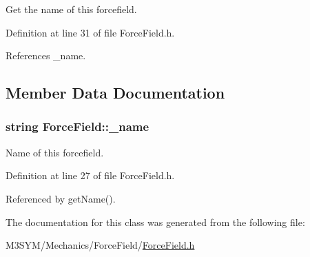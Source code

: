 Get the name of this forcefield. 



Definition at line 31 of file Force\+Field.\+h.



References \+\_\+name.



\subsection{Member Data Documentation}
\hypertarget{classForceField_a3d11aed54fdc916c9a0f50c19294c3aa}{
\subsubsection[{\+\_\+name}]{\setlength{\rightskip}{0pt plus 5cm}string Force\+Field\+::\+\_\+name\hspace{0.3cm}{\ttfamily [private]}}}\label{classForceField_a3d11aed54fdc916c9a0f50c19294c3aa}


Name of this forcefield. 



Definition at line 27 of file Force\+Field.\+h.



Referenced by get\+Name().



The documentation for this class was generated from the following file\+:\begin{DoxyCompactItemize}
\item 
M3\+S\+Y\+M/\+Mechanics/\+Force\+Field/\hyperlink{ForceField_8h}{Force\+Field.\+h}\end{DoxyCompactItemize}
